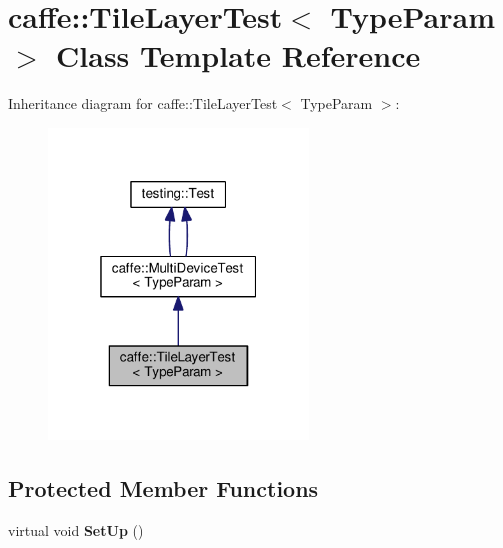\hypertarget{classcaffe_1_1_tile_layer_test}{}\section{caffe\+:\+:Tile\+Layer\+Test$<$ Type\+Param $>$ Class Template Reference}
\label{classcaffe_1_1_tile_layer_test}


Inheritance diagram for caffe\+:\+:Tile\+Layer\+Test$<$ Type\+Param $>$\+:
\nopagebreak
\begin{figure}[H]
\begin{center}
\leavevmode
\includegraphics[width=196pt]{classcaffe_1_1_tile_layer_test__inherit__graph}
\end{center}
\end{figure}
\subsection*{Protected Member Functions}
\begin{DoxyCompactItemize}
\item 
\mbox{\label{classcaffe_1_1_tile_layer_test_adad31f2e3151eb57dfb3abbc661f3192}} 
virtual void {\bfseries Set\+Up} ()
\end{DoxyCompactItemize}
